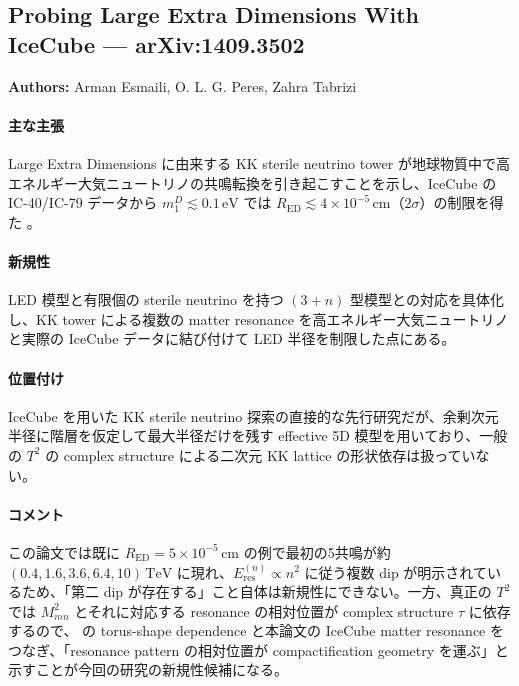 \subsection{Probing Large Extra Dimensions With IceCube --- arXiv:1409.3502}

\textbf{Authors:} Arman Esmaili, O. L. G. Peres, Zahra Tabrizi

\paragraph{主な主張}
Large Extra Dimensions に由来する KK sterile neutrino tower が地球物質中で高エネルギー大気ニュートリノの共鳴転換を引き起こすことを示し、IceCube の IC-40/IC-79 データから $m_1^D\lesssim0.1\,\mathrm{eV}$ では $R_{\mathrm{ED}}\lesssim4\times10^{-5}\,\mathrm{cm}$（$2\sigma$）の制限を得た \cite{Esmaili:2014IceCube}。

\paragraph{新規性}
LED 模型と有限個の sterile neutrino を持つ $(3+n)$ 型模型との対応を具体化し、KK tower による複数の matter resonance を高エネルギー大気ニュートリノと実際の IceCube データに結び付けて LED 半径を制限した点にある。

\paragraph{位置付け}
IceCube を用いた KK sterile neutrino 探索の直接的な先行研究だが、余剰次元半径に階層を仮定して最大半径だけを残す effective 5D 模型を用いており、一般の $T^2$ の complex structure による二次元 KK lattice の形状依存は扱っていない。

\paragraph{コメント}
この論文では既に $R_{\mathrm{ED}}=5\times10^{-5}\,\mathrm{cm}$ の例で最初の5共鳴が約 $(0.4,1.6,3.6,6.4,10)\,\mathrm{TeV}$ に現れ、$E_{\mathrm{res}}^{(n)}\propto n^2$ に従う複数 dip が明示されているため、「第二 dip が存在する」こと自体は新規性にできない。一方、真正の $T^2$ では $M_{m n}^2$ とそれに対応する resonance の相対位置が complex structure $\tau$ に依存するので、\cite{Mohanty:2016twisted} の torus-shape dependence と本論文の IceCube matter resonance をつなぎ、「resonance pattern の相対位置が compactification geometry を運ぶ」と示すことが今回の研究の新規性候補になる。
